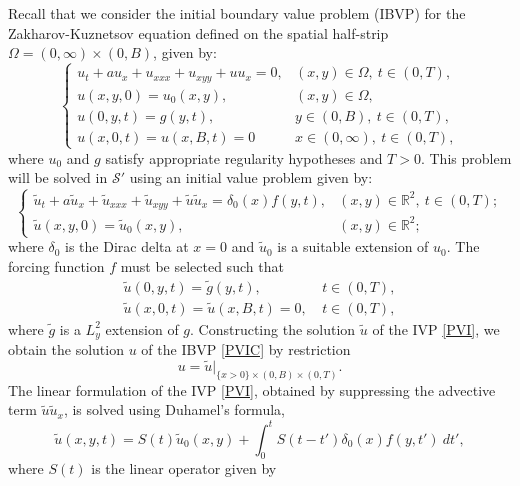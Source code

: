 \documentclass[11pt]{article}
\numberwithin{equation}{section}
\begin{document}
Recall that we consider the initial boundary value problem (IBVP) for the Zakharov-Kuznetsov equation defined on the spatial half-strip $\Omega = (0, \infty) \times (0, B)$, given by:
\begin{equation}\label{PVIC}\begin{cases}
u_t + au_{x} + u_{xxx} + u_{xyy} + u u_x = 0, & (x,y) \in \Omega, \ t \in (0, T), \\
u(x,y,0) = u_0(x,y), & (x,y) \in \Omega, \\
u(0,y,t) = g(y,t), & y \in (0, B), \ t \in (0, T),\\
u(x,0,t)=u(x,B,t)=0 & x\in (0,\infty), \ t\in (0,T),
\end{cases}\end{equation}
where $u_{0}$ and $g$ satisfy appropriate regularity hypotheses and $T>0$. This problem will be solved in $\mathcal{S}'$ using an initial value problem given by:
\begin{equation}\label{PVI}\begin{cases}
\tilde{u}_t + a\tilde{u}_{x} + \tilde{u}_{xxx} + \tilde{u}_{xyy} + \tilde{u} \tilde{u}_x = \delta_{0}(x)f(y,t), & (x,y) \in \mathbb{R}^{2}, \ t \in (0, T); \\
\tilde{u}(x,y,0) = \tilde{u}_0(x,y), & (x,y) \in \mathbb{R}^{2};
\end{cases}\end{equation}
where $\delta_{0}$ is the Dirac delta at $x=0$ and $\tilde{u}_{0}$ is a suitable extension of $u_{0}$. The forcing function $f$ must be selected such that
\begin{eqnarray}
    \tilde{u}(0,y,t)=\tilde{g}(y,t), &\ t\in (0,T),\label{x=0}\\
    \tilde{u}(x,0,t)=\tilde{u}(x,B,t)=0, &\ t\in (0,T),\label{y=B=0}
\end{eqnarray}
where $\tilde{g}$ is a $L_{y}^{2}$ extension of $g$. Constructing the solution $\tilde{u}$ of the IVP \eqref{PVI}, we obtain the solution $u$ of the IBVP \eqref{PVIC} by restriction
\begin{equation}
    u=\tilde{u}|_{\lbrace x>0\rbrace\times(0,B)\times (0,T)}.
\end{equation}
The linear formulation of the IVP \eqref{PVI}, obtained by suppressing the advective term $\tilde{u}\tilde{u}_{x}$, is solved using Duhamel's formula,
\begin{equation}
    \tilde{u}(x,y,t)=S(t)\tilde{u}_{0}(x,y)+\int_{0}^{t}S(t-t')\delta_{0}(x)f(y,t')\ dt',
\end{equation}
where $S(t)$ is the linear operator given by
\end{document}
